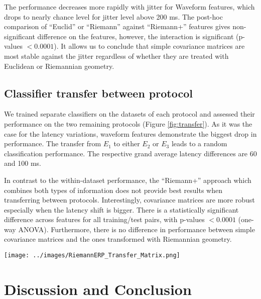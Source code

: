 \documentclass[12pt]{iopart}
\begin{document}
The performance decreases more
rapidly with jitter for Waveform features, which
drops to nearly chance level for jitter level above 200 ms.
The post-hoc comparison of ``Euclid'' or ``Riemann'' against ``Riemann+'' features gives non-significant
difference on the features, however, the interaction is significant (p-values $< 0.0001$).
It allows us to conclude that simple covariance matrices are most stable against the jitter
regardless of whether they are treated with Euclidean or Riemannian geometry.

\subsection{Classifier transfer between protocol}
We trained separate classifiers on the datasets of each protocol
and assessed their performance on the two remaining 
protocols (Figure \ref{fig:transfer}).
As it was the case for the latency variations, 
waveform features demonstrate the biggest drop
in performance. The transfer from $E_1$ to either $E_2$ or $E_3$
leads to a random classification performance. The respective grand average 
latency differences are 60 and 100 ms.

In contrast to the within-dataset performance, the ``Riemann+'' approach which
combines both types of information
does not provide best results when transferring between protocols.
Interestingly, covariance matrices are more robust
especially when the latency shift is bigger.
There is a statistically significant difference across features
for all training/test pairs, with p-values $< 0.0001$ (one-way ANOVA).
Furthermore, there is no difference in performance between simple covariance matrices
and the ones transformed with Riemannian geometry.


\begin{figure*}[!t]
    \centerline{\texttt{[image: ../images/RiemannERP\_Transfer\_Matrix.png]}}
    \caption{Cross-protocol classifier transfer. First three matrices show AUC estimated
    on test dataset (y-axis) with a classifier trained on a training dataset (x-axis).
    The right-most matrix provides p-values in $\mathrm{log_{10}}(\cdot)$ obtained with ANOVA when comparing features
    for each train/test pair.}
\label{fig:transfer}
\end{figure*}

\section{Discussion and Conclusion}
\label{sec:discussion}
\end{document}
